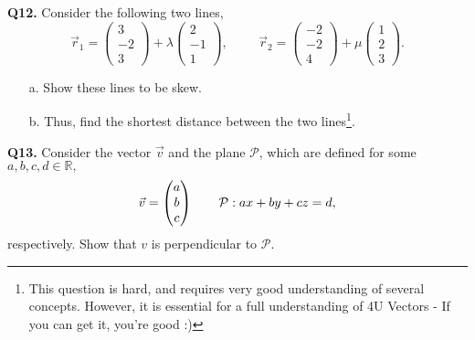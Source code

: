\documentclass{article}
\begin{document}
\textbf{Q12.} Consider the following two lines,
$$
\vec{r}_1 = 
\begin{pmatrix}
    3 \\ -2 \\ 3
\end{pmatrix} + \lambda
\begin{pmatrix}
    2 \\ -1 \\ 1
\end{pmatrix}, \hspace{1cm}
\vec{r}_2 = 
\begin{pmatrix}
    -2 \\ -2 \\ 4
\end{pmatrix} + \mu
\begin{pmatrix}
    1 \\ 2 \\ 3
\end{pmatrix}.
$$
\begin{enumerate}
    \item[a.] Show these lines to be skew.
    \item[b.] Thus, find the shortest distance between the two lines\footnote{This question is hard, and requires very good understanding of several concepts. However, it is essential for a full understanding of 4U Vectors - If you can get it, you're good :)}.
\end{enumerate}

\textbf{Q13.} Consider the vector $\vec{v}$ and the plane $\mathcal{P}$, which are defined for some $a,b,c,d \in \mathbb{R},$ 
$$
\vec{v} =
\begin{pmatrix}
    a \\ b \\ c
\end{pmatrix} \hspace{0.7cm}
\mathcal{P}: ax+by+cz=d,
$$
respectively.
Show that $v$ is perpendicular to $\mathcal{P}.$
\end{document}
